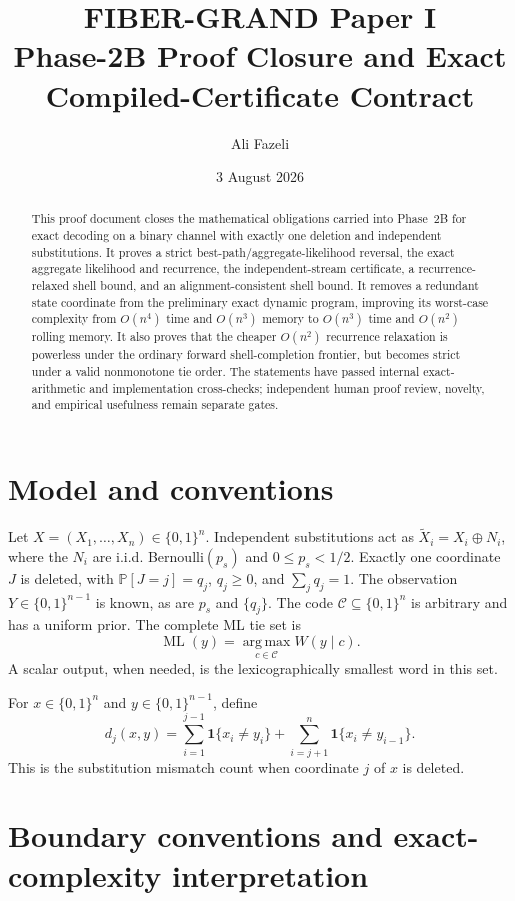 \documentclass[11pt]{article}
\title{FIBER-GRAND Paper I\\Phase-2B Proof Closure and Exact Compiled-Certificate Contract}
\author{Ali Fazeli}
\date{3 August 2026}
\theoremstyle{remark}
\newcommand{\C}{\mathcal C}
\newcommand{\ind}{\mathbf 1}
\newcommand{\Prb}{\mathbb P}
\newcommand{\argmax}{\operatorname*{arg\,max}}
\begin{document}
\maketitle

\begin{abstract}
This proof document closes the mathematical obligations carried into Phase~2B for exact decoding on a binary channel with exactly one deletion
and independent substitutions. It proves a strict best-path/aggregate-likelihood
reversal, the exact aggregate likelihood and recurrence, the independent-stream
certificate, a recurrence-relaxed shell bound, and an alignment-consistent shell bound.
It removes a redundant state coordinate from the preliminary exact dynamic program,
improving its worst-case complexity from $O(n^4)$ time and $O(n^3)$ memory to $O(n^3)$
time and $O(n^2)$ rolling memory. It also proves that the cheaper $O(n^2)$ recurrence
relaxation is powerless under the ordinary forward shell-completion frontier, but becomes
strict under a valid nonmonotone tie order. The statements have passed internal exact-arithmetic and implementation cross-checks; independent human proof review, novelty, and empirical usefulness remain separate gates.
\end{abstract}

\section{Model and conventions}

Let $X=(X_1,\ldots,X_n)\in\{0,1\}^n$. Independent substitutions act as
$\widetilde X_i=X_i\oplus N_i$, where the $N_i$ are i.i.d. Bernoulli$(p_s)$ and
$0\le p_s<1/2$. Exactly one coordinate $J$ is deleted, with
$\Prb[J=j]=q_j$, $q_j\ge0$, and $\sum_jq_j=1$. The observation
$Y\in\{0,1\}^{n-1}$ is known, as are $p_s$ and $\{q_j\}$. The code
$\C\subseteq\{0,1\}^n$ is arbitrary and has a uniform prior. The complete ML tie set is
\[
 \operatorname{ML}(y)=\argmax_{c\in\C}W(y\mid c).
\]
A scalar output, when needed, is the lexicographically smallest word in this set.

For $x\in\{0,1\}^n$ and $y\in\{0,1\}^{n-1}$, define
\begin{equation}
 d_j(x,y)=\sum_{i=1}^{j-1}\ind\{x_i\ne y_i\}
 +\sum_{i=j+1}^{n}\ind\{x_i\ne y_{i-1}\}.
 \label{eq:dj}
\end{equation}
This is the substitution mismatch count when coordinate $j$ of $x$ is deleted.



\section{Boundary conventions and exact-complexity interpretation}
\end{document}
